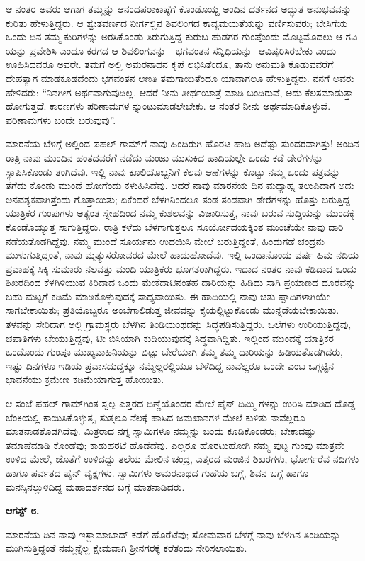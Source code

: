 ಆ ನಂತರ ಅವರು ಆಗಾಗ ತಮ್ಮನ್ನು ಆನಂದಪರಾಕಾಷ್ಠೆಗೆ ಕೊಂಡೊಯ್ದ ಅಂದಿನ ದರ್ಶನದ ಅದ್ಭುತ ಅನುಭವವನ್ನು ಕುರಿತು ಹೇಳುತ್ತಿದ್ದರು. ಆ ಶ್ವೇತವರ್ಣದ ನೀರ್ಗಲ್ಲಿನ ಶಿವಲಿಂಗದ ಕಾವ್ಯಮಯತೆಯನ್ನು ವರ್ಣಿಸುವರು; ಬೇಸಿಗೆಯ ಒಂದು ದಿನ ತಮ್ಮ ಕುರಿಗಳನ್ನು ಅರಸಿಕೊಂಡು ತಿರುಗುತ್ತಿದ್ದ ಕುರುಬ ಹುಡಗರ ಗುಂಪೊಂದು ಮೊಟ್ಟಮೊದಲು ಆ ಗವಿ ಯನ್ನು ಪ್ರವೇಶಿಸಿ ಎಂದೂ ಕರಗದ ಆ ಶಿವಲಿಂಗವನ್ನು - ಭಗವಂತನ ಸನ್ನಿಧಿಯನ್ನು -ಆವಿಷ್ಕರಿಸಿರಬೇಕು ಎಂದು ಊಹಿಸಿದವರೂ ಅವರೇ. ತಮಗೆ ಅಲ್ಲಿ ಅಮರನಾಥನ ಕೃಪೆ ಲಭಿಸಿತೆಂದೂ, ತಾನು ಅನುಮತಿ ಕೊಡುವವರೆಗೆ ದೇಹತ್ಯಾಗ ಮಾಡಕೂಡದೆಂದು ಭಗವಂತನ ಆಣತಿ ತಮಗಾಯಿತೆಂದೂ ಯಾವಾಗಲೂ ಹೇಳುತ್ತಿದ್ದರು. ನನಗೆ ಅವರು ಹೇಳಿದರು: “ನಿನಗೀಗ ಅರ್ಥವಾಗುವುದಿಲ್ಲ. ಆದರೆ ನೀನು ತೀರ್ಥಯಾತ್ರೆ ಮಾಡಿ ಬಂದಿರುವೆ, ಅದು ಕೆಲಸಮಾಡುತ್ತಾ ಹೋಗುತ್ತದೆ. ಕಾರಣಗಳು ಪರಿಣಾಮಗಳ ನ್ನುಂಟುಮಾಡಲೇಬೇಕು. ಆ ನಂತರ ನೀನು ಅರ್ಥಮಾಡಿಕೊಳ್ಳುವೆ. ಪರಿಣಾಮಗಳು ಬಂದೇ ಬರುವುವು”.

ಮಾರನೆಯ ಬೆಳಗ್ಗೆ ಅಲ್ಲಿಂದ ಪಹಲ್ ಗಾಮ್​ಗೆ ನಾವು ಹಿಂದಿರುಗಿ ಹೊರಟ ಹಾದಿ ಅದೆಷ್ಟು ಸುಂದರವಾಗಿತ್ತು! ಅಂದಿನ ರಾತ್ರಿ ನಾವು ಮುಂದಿನ ಹಂತದವರೆಗೆ ನಡೆದು ಮಂಜು ಮುಸುಕಿದ ಹಾದಿಯಲ್ಲೇ ಒಂದು ಕಡೆ ಡೇರೆಗಳನ್ನು ಸ್ಥಾಪಿಸಿಕೊಂಡು ತಂಗಿದೆವು. ಇಲ್ಲಿ ನಾವು ಕೂಲಿಯೊಬ್ಬನಿಗೆ ಕೆಲವು ಆಣೆಗಳನ್ನು ಕೊಟ್ಟು ನಮ್ಮ ಒಂದು ಪತ್ರವನ್ನು ತೆಗೆದು ಕೊಂಡು ಮುಂದೆ ಹೋಗೆಂದು ಕಳುಹಿಸಿದೆವು. ಆದರೆ ನಾವು ಮಾರನೆಯ ದಿನ ಮಧ್ಯಾಹ್ನ ತಲುಪಿದಾಗ ಅದು ಅನವಶ್ಯಕವಾಗಿತ್ತೆಂದು ಗೊತ್ತಾಯಿತು; ಏಕೆಂದರೆ ಬೆಳಗಿನಿಂದಲೂ ತಂಡ ತಂಡವಾಗಿ ಡೇರೆಗಳನ್ನು ಹೊತ್ತು ಬರುತ್ತಿದ್ದ ಯಾತ್ರಿಕರ ಗುಂಪುಗಳು ಅತ್ಯಂತ ಸ್ನೇಹದಿಂದ ನಮ್ಮ ಕುಶಲವನ್ನು ವಿಚಾರಿಸುತ್ತ, ನಾವು ಬರುವ ಸುದ್ದಿಯನ್ನು ಮುಂದಕ್ಕೆ ಕೊಂಡೊಯ್ಯುತ್ತ ಸಾಗುತ್ತಿದ್ದರು. ರಾತ್ರಿ ಕಳೆದು ಬೆಳಗಾಗುತ್ತಲೂ ಸೂರ್ಯೋದಯಕ್ಕಿಂತ ಮುಂಚೆಯೇ ನಾವು ದಾರಿ ನಡೆಯತೊಡಗಿದ್ದೆವು. ನಮ್ಮ ಮುಂದೆ ಸೂರ್ಯನು ಉದಯಿಸಿ ಮೇಲೆ ಬರುತ್ತಿದ್ದಂತೆ, ಹಿಂದುಗಡೆ ಚಂದ್ರನು ಮುಳುಗುತ್ತಿದ್ದಂತೆ, ನಾವು ಮೃತ್ಯುಸರೋವರದ ಮೇಲೆ ಹಾದುಹೋದೆವು. ಇಲ್ಲಿ ಒಂದಾನೊಂದು ವರ್ಷ ಹಿಮ ನದಿಯ ಪ್ರವಾಹಕ್ಕೆ ಸಿಕ್ಕಿ ಸುಮಾರು ನಲವತ್ತು ಮಂದಿ ಯಾತ್ರಿಕರು ಭೂಗತರಾಗಿದ್ದರು. ಇದಾದ ನಂತರ ನಾವು ಕಡಿದಾದ ಒಂದು ಶಿಖರದಿಂದ ಕೆಳಗಿಳಿಯುವ ಕಿರಿದಾದ ಒಂದು ಮೇಕೆದಾಟಿನಂತಹ ದಾರಿಯನ್ನು ಹಿಡಿದು ಸಾಗಿ ಪ್ರಯಾಣದ ದೂರವನ್ನು ಬಹು ಮಟ್ಟಗೆ ಕಡಿಮೆ ಮಾಡಿಕೊಳ್ಳುವುದಕ್ಕೆ ಸಾಧ್ಯವಾಯಿತು. ಈ ಹಾದಿಯಲ್ಲಿ ನಾವು ಚತು ಷ್ಪಾದಿಗಳಾಗಿಯೇ ಸಾಗಬೇಕಾಯಿತು; ಪ್ರತಿಯೊಬ್ಬರೂ ಅಂಬೆಗಾಲಿಡುತ್ತ ಜೀವವನ್ನು ಕೈಯಲ್ಲಿಟ್ಟುಕೊಂಡು ಮುನ್ನಡೆಯಬೇಕಾಯಿತು. ತಳವನ್ನು ಸೇರಿದಾಗ ಅಲ್ಲಿ ಗ್ರಾಮಸ್ಥರು ಬೆಳಗಿನ ತಿಂಡಿಯಂಥದನ್ನು ಸಿದ್ಧಪಡಿಸುತ್ತಿದ್ದರು. ಒಲೆಗಳು ಉರಿಯುತ್ತಿದ್ದವು, ಚಪಾತಿಗಳು ಬೇಯುತ್ತಿದ್ದವು, ಟೀ ಬಿಸಿಯಾಗಿ ಕುಡಿಯುವುದಕ್ಕೆ ಸಿದ್ಧವಾಗಿದ್ದಿತು. ಇಲ್ಲಿಂದ ಮುಂದಕ್ಕೆ ಯಾತ್ರಿಕರ ಒಂದೊಂದು ಗುಂಪೂ ಮುಖ್ಯವಾಹಿನಿಯನ್ನು ಬಿಟ್ಟು ಬೇರೆಯಾಗಿ ತಮ್ಮ ತಮ್ಮ ದಾರಿಯನ್ನು ಹಿಡಿಯತೊಡಗಿದರು, ಇಷ್ಟು ದಿನಗಳೂ ಇಡಿಯ ಪ್ರವಾಸದುದ್ದಕ್ಕೂ ನಮ್ಮೆಲ್ಲರಲ್ಲಿಯೂ ಬೆಳೆದಿದ್ದ ನಾವೆಲ್ಲರೂ ಒಂದೇ ಎಂಬ ಒಗ್ಗಟ್ಟಿನ ಭಾವನೆಯು ಕ್ರಮೇಣ ಕಡಿಮೆಯಾಗುತ್ತ ಹೋಯಿತು.

ಆ ಸಂಜೆ ಪಹಲ್ ಗಾಮ್​ಗಿಂತ ಸ್ವಲ್ಪ ಎತ್ತರದ ದಿಣ್ಣೆಯೊಂದರ ಮೇಲೆ ಪೈನ್ ದಿಮ್ಮಿ ಗಳನ್ನು ಉರಿಸಿ ಮಾಡಿದ ದೊಡ್ಡ ಬೆಂಕಿಯಲ್ಲಿ ಕಾಯಿಸಿಕೊಳ್ಳುತ್ತ, ಸುತ್ತಲೂ ನೆಲಕ್ಕೆ ಹಾಸಿದ ಜಮಖಾನಗಳ ಮೇಲೆ ಕುಳಿತು ನಾವೆಲ್ಲರೂ ಮಾತನಾಡತೊಡಗಿದೆವು. ಮಿತ್ರರಾದ ನಗ್ನ ಸ್ವಾಮಿಗಳೂ ನಮ್ಮನ್ನು ಬಂದು ಕೂಡಿಕೊಂಡರು; ಬೇಕಾದಷ್ಟು ತಮಾಷೆಮಾಡಿ ಕೊಂಡೆವು; ಕಾಡುಹರಟೆ ಹೊಡೆದೆವು. ಎಲ್ಲರೂ ಹೊರಟುಹೋಗಿ ನಮ್ಮ ಪುಟ್ಟ ಗುಂಪು ಮಾತ್ರವೇ ಉಳಿದ ಮೇಲೆ, ಜೊತೆಗೆ ಉಳಿದದ್ದು ತಲೆಯ ಮೇಲಿನ ಚಂದ್ರ, ಎತ್ತರದ ಮಂಜಿನ ಶಿಖರಗಳು, ಭೋರ್ಗರೆವ ನದಿಗಳು ಹಾಗೂ ಪರ್ವತದ ಪೈನ್ ವೃಕ್ಷಗಳು. ಸ್ವಾಮಿಗಳು ಅಮರನಾಥದ ಗುಹೆಯ ಬಗ್ಗೆ, ಶಿವನ ಬಗ್ಗೆ ಹಾಗೂ ಮನಸ್ಸಿನಲ್ಲುಳಿದಿದ್ದ ಮಹಾದರ್ಶನದ ಬಗ್ಗೆ ಮಾತನಾಡಿದರು.

\textbf{ಆಗಸ್ಟ್ ೮.}

ಮಾರನೆಯ ದಿನ ನಾವು ಇಸ್ಲಾಮಾಬಾದ್ ಕಡೆಗೆ ಹೊರೆಟೆವು; ಸೋಮವಾರ ಬೆಳಗ್ಗೆ ನಾವು ಬೆಳಗಿನ ತಿಂಡಿಯನ್ನು ಮುಗಿಸುತ್ತಿದ್ದಂತೆ ನಮ್ಮನ್ನೆಲ್ಲ ಕ್ಷೇಮವಾಗಿ ಶ‍್ರೀನಗರಕ್ಕೆ ಕರೆತಂದು ಸೇರಿಸಲಾಯಿತು.

